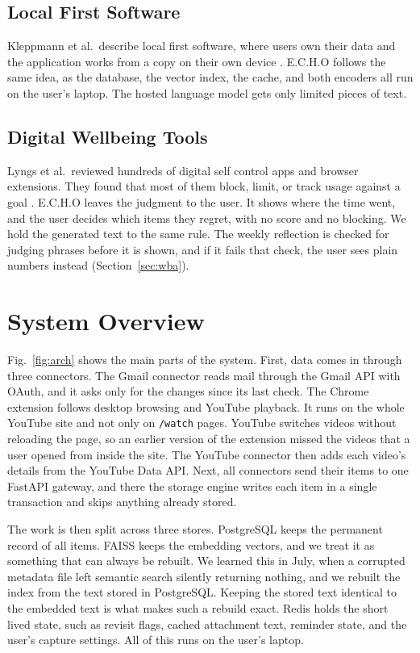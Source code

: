 \documentclass[conference]{IEEEtran}
\begin{document}
\subsection{Local First Software}
Kleppmann et al.\ describe local first software, where users own their data and the application works from a copy on their own device \cite{b12}. E.C.H.O follows the same idea, as the database, the vector index, the cache, and both encoders all run on the user's laptop. The hosted language model gets only limited pieces of text.

\subsection{Digital Wellbeing Tools}
Lyngs et al.\ reviewed hundreds of digital self control apps and browser extensions. They found that most of them block, limit, or track usage against a goal \cite{b14}. E.C.H.O leaves the judgment to the user. It shows where the time went, and the user decides which items they regret, with no score and no blocking. We hold the generated text to the same rule. The weekly reflection is checked for judging phrases before it is shown, and if it fails that check, the user sees plain numbers instead (Section~\ref{sec:wba}).

\section{System Overview}\label{sec:overview}
Fig.~\ref{fig:arch} shows the main parts of the system. First, data comes in through three connectors. The Gmail connector reads mail through the Gmail API with OAuth, and it asks only for the changes since its last check. The Chrome extension follows desktop browsing and YouTube playback. It runs on the whole YouTube site and not only on \texttt{/watch} pages. YouTube switches videos without reloading the page, so an earlier version of the extension missed the videos that a user opened from inside the site. The YouTube connector then adds each video's details from the YouTube Data API. Next, all connectors send their items to one FastAPI gateway, and there the storage engine writes each item in a single transaction and skips anything already stored.

The work is then split across three stores. PostgreSQL keeps the permanent record of all items. FAISS keeps the embedding vectors, and we treat it as something that can always be rebuilt. We learned this in July, when a corrupted metadata file left semantic search silently returning nothing, and we rebuilt the index from the text stored in PostgreSQL. Keeping the stored text identical to the embedded text is what makes such a rebuild exact. Redis holds the short lived state, such as revisit flags, cached attachment text, reminder state, and the user's capture settings. All of this runs on the user's laptop.
\end{document}
